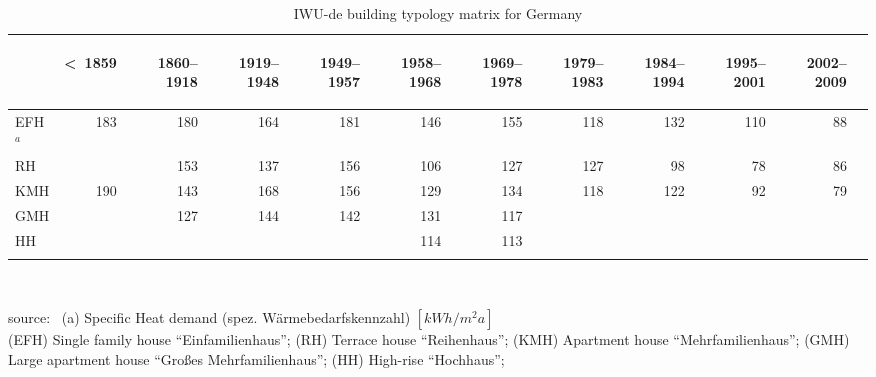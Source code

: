 \begin{table}[htbp]
  \centering
  \caption{IWU-de building typology matrix for Germany}\label{tab:IWU-de}%
    \begin{tabular}{l r rrr rrr rrr r}
    \addlinespace
    \toprule
    &
    \begin{sideways}\textless~1859\end{sideways}&  %
    \begin{sideways}1860--1918\end{sideways}&     %
    \begin{sideways}1919--1948\end{sideways}&     %
    \begin{sideways}1949--1957\end{sideways}&     %
    \begin{sideways}1958--1968\end{sideways}&     %
    \begin{sideways}1969--1978\end{sideways}&     %
    \begin{sideways}1979--1983\end{sideways}&     %
    \begin{sideways}1984--1994\end{sideways}&     %
    \begin{sideways}1995--2001\end{sideways}&     %
    \begin{sideways}2002--2009\end{sideways}\\    %
    \midrule
EFH$^a$&183&180&164&181&146&155&118&132&110&88\\
RH     &   &153&137&156&106&127&127& 98& 78&86\\
KMH    &190&143&168&156&129&134&118&122& 92&79\\
GMH    &   &127&144&142&131&117&   &   &   &  \\
HH     &   &   &   &   &114&113&   &   &   &  \\
    \bottomrule
    \addlinespace
    \end{tabular}\\
    \begin{footnotesize}    
    source:~\cite{Loga.2011} 
    (a) Specific Heat demand (spez. W\"armebedarfskennzahl)
    $[kWh/m^{2}a]$\\
(EFH) Single family house ``Einfamilienhaus'';
(RH) Terrace house ``Reihenhaus'';
(KMH) Apartment house ``Mehrfamilienhaus'';
(GMH) Large apartment house ``Großes Mehrfamilienhaus'';
(HH) High-rise ``Hochhaus'';
    \end{footnotesize}
\end{table}